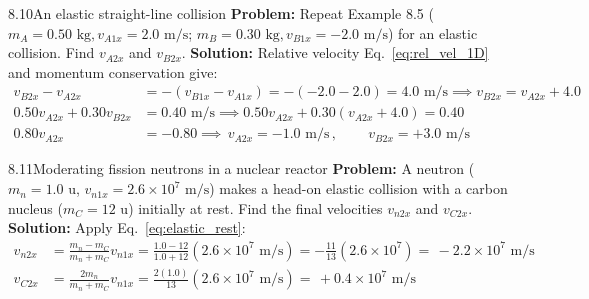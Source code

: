 \documentclass[11pt,a4paper,openany,oneside]{book}
\newcommand{\eqbox}[1]{\boxed{\,#1\,}}
\numberwithin{equation}{chapter}
\newcommand{\bk}[1]{\texorpdfstring{\enspace{\normalfont\small\color{slate}[Book #1]}}{ [Book #1]}}
\begin{document}
\begin{example}{8.10}{An elastic straight-line collision\bk{p.\ 257}}
\textbf{Problem:} Repeat Example 8.5 ($m_A = 0.50\text{ kg}, v_{A1x} = 2.0\text{ m/s}$; $m_B = 0.30\text{ kg}, v_{B1x} = -2.0\text{ m/s}$) for an elastic collision. Find $v_{A2x}$ and $v_{B2x}$.
\tcblower
\textbf{Solution:} Relative velocity Eq.\ \eqref{eq:rel_vel_1D} and momentum conservation give:
\begin{align*}
  v_{B2x} - v_{A2x} &= -(v_{B1x} - v_{A1x}) = -(-2.0 - 2.0) = 4.0\text{ m/s} \implies v_{B2x} = v_{A2x} + 4.0\\
  0.50v_{A2x} + 0.30v_{B2x} &= 0.40\text{ m/s} \implies 0.50v_{A2x} + 0.30(v_{A2x} + 4.0) = 0.40\\
  0.80v_{A2x} &= -0.80 \implies \eqbox{v_{A2x} = -1.0\text{ m/s}}, \qquad \eqbox{v_{B2x} = +3.0\text{ m/s}}
\end{align*}
\end{example}

\begin{example}{8.11}{Moderating fission neutrons in a nuclear reactor\bk{p.\ 257}}
\textbf{Problem:} A neutron ($m_n = 1.0\text{ u}$, $v_{n1x} = 2.6\times 10^7\text{ m/s}$) makes a head-on elastic collision with a carbon nucleus ($m_C = 12\text{ u}$) initially at rest. Find the final velocities $v_{n2x}$ and $v_{C2x}$.
\tcblower
\textbf{Solution:} Apply Eq.\ \eqref{eq:elastic_rest}:
\begin{align*}
  v_{n2x} &= \frac{m_n - m_C}{m_n + m_C}v_{n1x} = \frac{1.0 - 12}{1.0 + 12}(2.6\times 10^7\text{ m/s}) = -\frac{11}{13}(2.6\times 10^7) = \eqbox{-2.2\times 10^7\text{ m/s}}\\
  v_{C2x} &= \frac{2m_n}{m_n + m_C}v_{n1x} = \frac{2(1.0)}{13}(2.6\times 10^7\text{ m/s}) = \eqbox{+0.4\times 10^7\text{ m/s}}
\end{align*}
\end{example}
\end{document}
